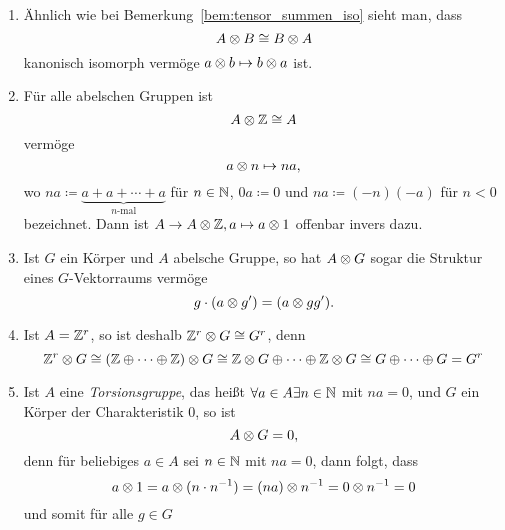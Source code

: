 \begin{beispiel}
  \begin{enumerate}
    \item
      Ähnlich wie bei Bemerkung~\ref{bem:tensor_summen_iso} sieht man, dass
      \begin{equation*}
        A \otimes B \cong B \otimes A
      \end{equation*}
      kanonisch isomorph vermöge $a \otimes b \mapsto b \otimes a$ ist.
    \item
      Für alle abelschen Gruppen ist
      \begin{equation*}
        A \otimes \mathbb{Z} \cong A
      \end{equation*}
      vermöge
      \begin{equation*}
        a \otimes n \mapsto n a,
      \end{equation*}
      wo $n a \coloneqq \underbrace{a + a + \dotsb + a}_{n\text{-mal}}$ für $n \in \mathbb{N}$, $0 a \coloneqq 0$ und $n a \coloneqq (-n) (-a)$ für $n < 0$ bezeichnet.
      Dann ist $A \to A \otimes \mathbb{Z}, a \mapsto a \otimes 1$ offenbar invers dazu.
    \item
      Ist $G$ ein Körper und $A$ abelsche Gruppe, so hat $A \otimes G$ sogar die Struktur eines $G$-Vektorraums vermöge
      \begin{equation*}
        g \cdot (a \otimes g') = (a \otimes gg').
      \end{equation*}
    \item
      Ist $A = \mathbb{Z}^r$, so ist deshalb $\mathbb{Z}^r \otimes G \cong G^{r}$, denn
      \begin{equation*}
        \mathbb{Z}^r \otimes G \cong (\mathbb{Z} \oplus \dotsb \oplus \mathbb{Z}) \otimes G
        \cong \mathbb{Z} \otimes G \oplus \dotsb \oplus \mathbb{Z} \otimes G
        \cong G \oplus \dotsm \oplus G = G^r
      \end{equation*}
    \item
      Ist $A$ eine \emph{Torsionsgruppe}, das heißt $\forall a \in A \exists n \in \mathbb{N}$ mit $n a = 0$, und $G$ ein Körper der Charakteristik $0$, so ist
      \begin{equation*}
        A \otimes G = 0,
      \end{equation*}
      denn für beliebiges $a \in A$ sei $n \in \mathbb{N}$ mit $n a = 0$, dann folgt, dass
      \begin{equation*}
        a \otimes 1 = a \otimes (n \cdot n^{-1}) = (na) \otimes n^{-1} = 0 \otimes n^{-1} = 0
      \end{equation*}
      und somit für alle $g \in G$
      \begin{equation*}

\end{equation*}
\end{enumerate}
\end{beispiel}
